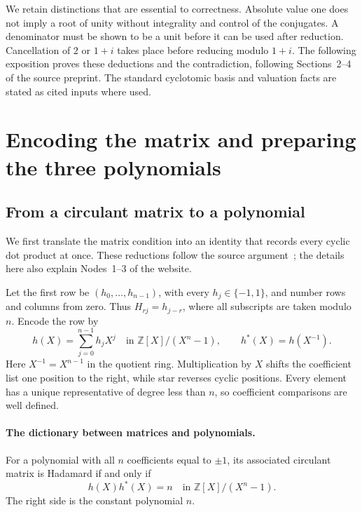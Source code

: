 \documentclass[11pt]{article}
\begin{document}
We retain distinctions that are essential to correctness. Absolute value
one does not imply a root of unity without integrality and control of the
conjugates. A denominator must be shown to be a unit before it can be used
after reduction. Cancellation of $2$ or $1+i$ takes place before reducing
modulo $1+i$. The following exposition proves these deductions and the
contradiction, following Sections~2--4 of the source preprint. The standard
cyclotomic basis and valuation facts are stated as cited inputs where used.

\section{Encoding the matrix and preparing the three polynomials}%
\label{sec:early}
\subsection{From a circulant matrix to a polynomial}%
\label{sec:proof-encoding}

We first translate the matrix condition into an identity that records every
cyclic dot product at once. These reductions follow the source argument~\cite[Sections~2 and~4]{circulant-source}; the details here also explain
Nodes~1--3 of the website.

Let the first row be $(h_{0},\ldots,h_{n-1})$, with every $h_{j}\in\{-1,1\}$,
and number rows and columns from zero. Thus $H_{rj}=h_{j-r}$, where all
subscripts are taken modulo $n$. Encode the row by
\[
  h(X)=\sum_{j=0}^{n-1}h_{j}X^{j}
  \quad\text{in }\mathbb Z[X]/(X^{n}-1),
  \qquad
  h^{*}(X)=h(X^{-1}).
\]
Here $X^{-1}=X^{n-1}$ in the quotient ring. Multiplication by $X$ shifts
the coefficient list one position to the right, while star reverses cyclic
positions. Every element has a unique representative of degree less than
$n$, so coefficient comparisons are well defined.

\paragraph{The dictionary between matrices and polynomials.}
For a polynomial with all $n$ coefficients equal to $\pm1$, its associated
circulant matrix is Hadamard if and only if
\begin{equation}
  h(X)h^{*}(X)=n
  \quad\text{in }\mathbb Z[X]/(X^{n}-1).%
  \label{eq:early-group-ring-norm}
\end{equation}
The right side is the constant polynomial $n$.
\end{document}
